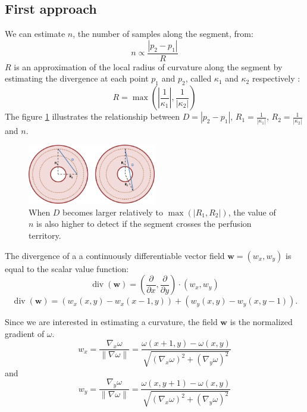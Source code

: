 \documentclass[11pt,a4paper]{article}
\newcommand{\mydiv}{\ensuremath{\operatorname{div}}}
\newcommand{\myvec}[1]{\ensuremath{\mathbf{#1}}}
\begin{document}
	\subsection{First approach} \label{firstaproach}

We can estimate $n$, the number of samples along the segment, from:
\begin{equation}
n \propto \frac{|p_2 - p_1|}{R}
\end{equation}
$R$ is an approximation of the local radius of curvature along the segment by estimating the divergence at each point $p_1$ and $p_2$, called $\kappa_1$ and $\kappa_2$ respectively :
\begin{equation}
R = \max(|\frac{1}{\kappa_1}|, \frac{1}{|\kappa_2|})
\end{equation} 
The figure \ref{example} illustrates the relationship between $D = |p_2 - p_1|$, $R_1= \frac{1}{|\kappa_1|}$, $R_2=\frac{1}{|\kappa_2|}$ and $n$. 
\begin{figure}[h!]
\centering
\includegraphics[width=0.5\textwidth]{Drawings/CurvatureTestExample.png}
\caption{When $D$ becomes larger relatively to $\max(|R_1, R_2|)$, the value of $n$ is also higher to detect if the segment crosses the perfusion territory.}
\label{example}
\end{figure}

The divergence of a a continuously differentiable vector field $\myvec{w}=(w_x,w_y)$ is equal to the scalar value function:
\begin{equation}
\mydiv (\myvec{w}) = (\frac{\partial}{\partial x}, \frac{\partial}{\partial y}) \cdot (w_x, w_y) 
\end{equation}
\begin{equation}
\mydiv (\myvec{w}) = \left( w_x(x, y) - w_x(x-1, y) \right) + \left( w_y(x, y) - w_y(x, y - 1) \right).
\end{equation}

Since we are interested in estimating a curvature, the field $\myvec{w}$ is the normalized gradient of $\omega$.
\begin{equation}
w_x = \frac{\nabla_x \omega}{\|\nabla \omega\|} = \frac{\omega (x + 1, y) - \omega (x, y)}{\sqrt{(\nabla_x\omega)^2 + (\nabla_y\omega)^2}}
\end{equation}
and
\begin{equation}
w_y = \frac{\nabla_y \omega}{\|\nabla \omega\|} = \frac{\omega (x, y + 1) - \omega (x, y)}{\sqrt{(\nabla_x\omega)^2 + (\nabla_y\omega)^2}}
\end{equation}	
\end{document}
